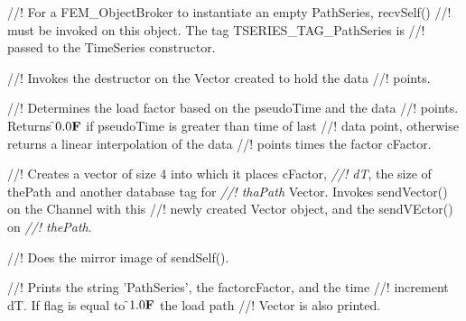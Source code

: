 //! For a FEM\_ObjectBroker to instantiate an empty PathSeries, recvSelf()
//! must be invoked on this object. The tag TSERIES\_TAG\_PathSeries is
//! passed to the TimeSeries constructor.


//! Invokes the destructor on the Vector created to hold the data
//! points.


//! Determines the load factor based on the \p pseudoTime and the data
//! points. Returns \f$0.0{\bf F}$ if \p pseudoTime is greater than time of last
//! data point, otherwise returns a linear interpolation of the data
//! points times the factor \p cFactor.

//! Creates a vector of size 4 into which it places \p cFactor, {\em
//! dT}, the size of \p thePath and another database tag for {\em
//! thaPath} Vector.  Invokes sendVector() on the Channel with this
//! newly created Vector object, and the sendVEctor() on {\em
//! thePath}.

//! Does the mirror image of sendSelf().

//! Prints the string 'PathSeries', the factor\p cFactor, and the time
//! increment \p dT. If \p flag is equal to \f$1.0{\bf F}$ the load path
//! Vector is also printed.



